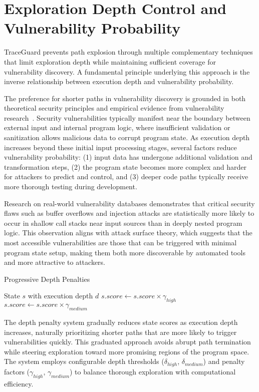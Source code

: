 \section{Exploration Depth Control and Vulnerability Probability}\label{sec:exploration_depth_control}

TraceGuard prevents path explosion through multiple complementary techniques that limit exploration depth while maintaining sufficient coverage for vulnerability discovery. A fundamental principle underlying this approach is the inverse relationship between execution depth and vulnerability probability.

The preference for shorter paths in vulnerability discovery is grounded in both theoretical security principles and empirical evidence from vulnerability research~\cite{schwartz_all_2010}. Security vulnerabilities typically manifest near the boundary between external input and internal program logic, where insufficient validation or sanitization allows malicious data to corrupt program state. As execution depth increases beyond these initial input processing stages, several factors reduce vulnerability probability: (1) input data has undergone additional validation and transformation steps, (2) the program state becomes more complex and harder for attackers to predict and control, and (3) deeper code paths typically receive more thorough testing during development.

Research on real-world vulnerability databases demonstrates that critical security flaws such as buffer overflows and injection attacks are statistically more likely to occur in shallow call stacks near input sources than in deeply nested program logic. This observation aligns with attack surface theory, which suggests that the most accessible vulnerabilities are those that can be triggered with minimal program state setup, making them both more discoverable by automated tools and more attractive to attackers.

\begin{algorithm}[H]
\caption{Progressive Depth Penalties}
\begin{algorithmic}[1]
\Require State $s$ with execution depth $d$
    \State $s.score \gets s.score \times \gamma_{high}$
    \State $s.score \gets s.score \times \gamma_{medium}$
\EndIf
\end{algorithmic}
\end{algorithm}

The depth penalty system gradually reduces state scores as execution depth increases, naturally prioritizing shorter paths that are more likely to trigger vulnerabilities quickly. This graduated approach avoids abrupt path termination while steering exploration toward more promising regions of the program space. The system employs configurable depth thresholds ($\delta_{high}$, $\delta_{medium}$) and penalty factors ($\gamma_{high}$, $\gamma_{medium}$) to balance thorough exploration with computational efficiency.

